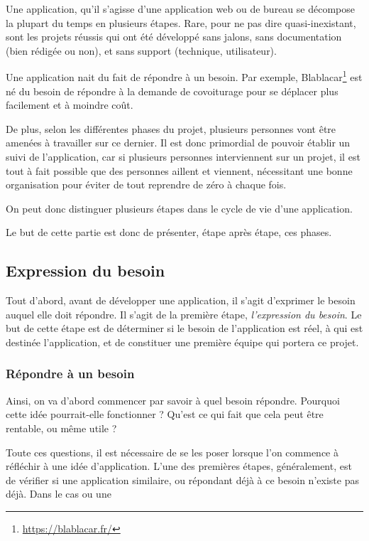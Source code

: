 
Une application, qu'il s'agisse d'une application web ou de bureau se décompose la plupart du temps en plusieurs étapes. Rare, pour ne pas dire quasi-inexistant, sont les projets réussis qui ont été développé sans jalons, sans documentation (bien rédigée ou non), et sans support (technique, utilisateur).

Une application nait du fait de répondre à un besoin. Par exemple, Blablacar\footnote{\url{https://blablacar.fr/}} est né du besoin de répondre à la demande de covoiturage pour se déplacer plus facilement et à moindre coût.

De plus, selon les différentes phases du projet, plusieurs personnes vont être amenées à travailler sur ce dernier. Il est donc primordial de pouvoir établir un suivi de l'application, car si plusieurs personnes interviennent sur un projet, il est tout à fait possible que des personnes aillent et viennent, nécessitant une bonne organisation pour éviter de tout reprendre de zéro à chaque fois.

On peut donc distinguer plusieurs étapes dans le cycle de vie d'une application.

Le but de cette partie est donc de présenter, étape après étape, ces phases.


\subsection{Expression du besoin}

Tout d'abord, avant de développer une application, il s'agit d'exprimer le besoin auquel elle doit répondre. Il s'agit de la première étape, \emph{l'expression du besoin}. Le but de cette étape est de déterminer si le besoin de l'application est réel, à qui est destinée l'application, et de constituer une première équipe qui portera ce projet.

\subsubsection{Répondre à un besoin}

Ainsi, on va d'abord commencer par savoir à quel besoin répondre. Pourquoi cette idée pourrait-elle fonctionner ? Qu'est ce qui fait que cela peut être rentable, ou même utile ? 

Toute ces questions, il est nécessaire de se les poser lorsque l'on commence à réfléchir à une idée d'application. L'une des premières étapes, généralement, est de vérifier si une application similaire, ou répondant déjà à ce besoin n'existe pas déjà. Dans le cas ou une 

